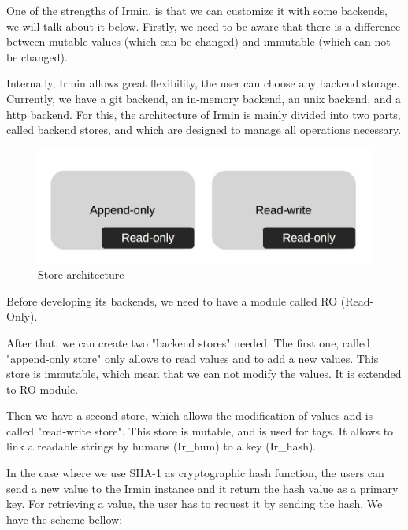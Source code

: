 \documentclass[10pt,a4paper]{report}
\begin{document}
One of the strengths of Irmin, is that we can customize it with some backends, we will talk about it below. 
Firstly, we need to be aware that there is a difference between mutable values (which can be changed) and immutable (which can not be changed). \newline

Internally, Irmin allows great flexibility, the user can choose any backend storage. Currently, we have a git backend, an in-memory backend, an unix backend, and a http backend.
For this, the architecture of Irmin is mainly divided into two parts, called backend stores, and which are designed to manage all operations necessary. \newline

\begin{figure}[H]
\centerline{\includegraphics[scale=0.5]{img/append-only-read-write.jpg}}
\caption{Store architecture}
\end{figure}

Before developing its backends, we need to have a module called RO (Read-Only). \newline

After that, we can create two "backend stores" needed. The first one, called "append-only store" only allows to read values and to add a new values.
This store is immutable, which mean that we can not modify the values. It is extended to RO module. \newline

Then we have a second store, which allows the modification of values and is called "read-write store". 
This store is mutable, and is used for tags. It allows to link a readable strings by humans (Ir\_hum) to a key (Ir\_hash).  \newline

In the case where we use SHA-1 as cryptographic hash function, the users can send a new value to the Irmin instance and it return the hash value as a primary key.
For retrieving a value, the user has to request it by sending the hash. We have the scheme bellow: \newline
\end{document}
